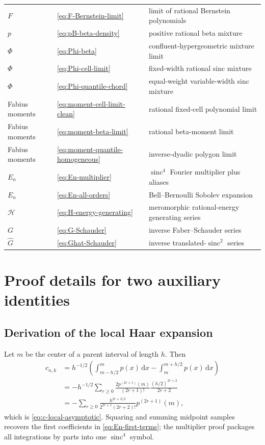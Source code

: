 \documentclass[11pt,oneside]{article}
\theoremstyle{definition}
\theoremstyle{remark}
\newcommand{\sinc}{\operatorname{sinc}}
\newcommand{\dd}{\,\mathrm d}
\begin{document}
\begin{longtable}{@{}p{}p{}p{}@{}}
$F$ & \eqref{eq:F-Bernstein-limit} & limit of rational Bernstein polynomials\\
$p$ & \eqref{eq:pB-beta-density} & positive rational beta mixture\\
$\Phi$ & \eqref{eq:Phi-beta} & confluent-hypergeometric mixture limit\\
$\Phi$ & \eqref{eq:Phi-cell-limit} & fixed-width rational sinc mixture\\
$\Phi$ & \eqref{eq:Phi-quantile-chord} & equal-weight variable-width sinc mixture\\
Fabius moments & \eqref{eq:moment-cell-limit-clean} & rational fixed-cell polynomial limit\\
Fabius moments & \eqref{eq:moment-beta-limit} & rational beta-moment limit\\
Fabius moments & \eqref{eq:moment-quantile-homogeneous} & inverse-dyadic polygon limit\\
$E_n$ & \eqref{eq:En-multiplier} & $\sinc^4$ Fourier multiplier plus aliases\\
$E_n$ & \eqref{eq:En-all-orders} & Bell--Bernoulli Sobolev expansion\\
$\mathcal H$ & \eqref{eq:H-energy-generating} & meromorphic rational-energy generating series\\
$G$ & \eqref{eq:G-Schauder} & inverse Faber--Schauder series\\
$\widehat G$ & \eqref{eq:Ghat-Schauder} & inverse translated-$\sinc^2$ series\\
\bottomrule
\end{longtable}

\section{Proof details for two auxiliary identities}
\label{app:proof-details}

\subsection{Derivation of the local Haar expansion}

Let $m$ be the center of a parent interval of length $h$.  Then
\begin{align*}
 c_{n,k}
 &=h^{-1/2}\left(
   \int_{m-h/2}^{m}p(x)\dd x-
   \int_m^{m+h/2}p(x)\dd x\right)\\
 &=-h^{-1/2}\sum_{r\ge0}
   \frac{2p^{(2r+1)}(m)}{(2r+1)!}
   \frac{(h/2)^{2r+2}}{2r+2}\\
 &=-\sum_{r\ge0}
   \frac{h^{2r+3/2}}{2^{2r+1}(2r+2)!}p^{(2r+1)}(m),
\end{align*}
which is \eqref{eq:c-local-asymptotic}.  Squaring and summing midpoint samples
recovers the first coefficients in \eqref{eq:En-first-terms}; the multiplier
proof packages all integrations by parts into one $\sinc^4$ symbol.
\end{document}
